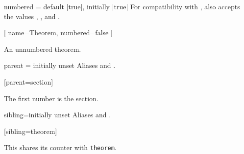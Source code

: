 \documentclass{ltxdoc}
\begin{document}
\begin{docKey}{numbered}
  {=\textbar{}\textbar {}}
  {default |true|, initially |true|}
For compatibility with , also accepts the values , , and .

\begin{tcbwritetemp}
[
  name=Theorem, numbered=false
  ]
\end{tcbwritetemp}

\begin{keythmscode}[withpreamble]
\begin{theorem*}
An unnumbered theorem.
\end{theorem*}
\end{keythmscode}

\end{docKey}

\begin{docKey}{parent}
  {=}
  {initially unset}
Aliases  and .

\begin{tcbwritetemp}
[parent=section]
\end{tcbwritetemp}

\begin{keythmscode}[withpreamble]
\begin{conjecture}
The first number is the section.
\end{conjecture}
\end{keythmscode}

\end{docKey}

\begin{docKey}{sibling}{=}{initially unset}
Aliases  and .

\begin{tcbwritetemp}
[sibling=theorem]
\end{tcbwritetemp}

\begin{keythmscode}[withpreamble]
\begin{lemma}
This shares its counter with
\texttt{theorem}.
\end{lemma}
\end{keythmscode}

\end{docKey}
\end{document}
